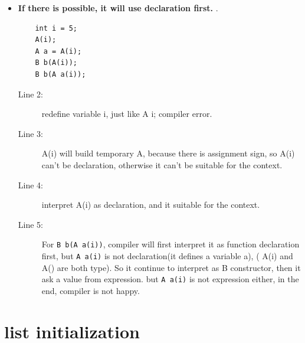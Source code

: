 \documentclass[a4paper,11pt,twoside]{book}
\begin{document}
\begin{itemize}
	\item \textbf{If there is possible, it will use declaration first. }.
\begin{lstlisting}
	int i = 5;
	A(i);
	A a = A(i);
	B b(A(i));
	B b(A a(i));
\end{lstlisting}	
	\begin{description}
		\item[Line 2:] redefine variable i, just like A i; compiler error.
		
		\item[Line 3:] A(i) will build temporary A, because there is assignment sign, so A(i) can't be declaration, otherwise it can't be suitable for the context.
		
		\item[Line 4:] interpret A(i) as declaration, and it suitable for the context.
		
		\item[Line 5:] For \texttt{B b(A a(i))}, compiler will first interpret it as function declaration first, but \texttt{A a(i)} is not declaration(it defines a variable a), ( A(i) and A() are both type). So it continue to interpret as B constructor, then it ask a value from expression. but \texttt{A a(i)} is not expression either, in the end, compiler is not happy. 
	\end{description}
			
\end{itemize}



\section{list initialization}
\end{document}
